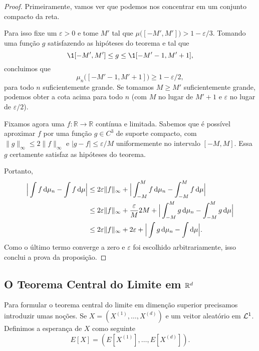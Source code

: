 \begin{proof}
  Primeiramente, vamos ver que podemos nos concentrar em um conjunto compacto da reta.

  Para isso fixe um $\varepsilon > 0$ e tome $M'$ tal que $\mu\big( [-M', M'] \big) > 1 - \varepsilon / 3$.
  Tomando uma função $g$ satisfazendo as hipóteses do teorema e tal que
  \begin{equation}
    \1{[-M',M']} \leq g \leq \1{[-M'-1,M'+1]},
  \end{equation}
  concluimos que
  \begin{equation}
    \mu_n \big( [-M'-1, M'+1] \big) \geq 1 - \varepsilon/2,
  \end{equation}
  para todo $n$ suficientemente grande.
  Se tomamos $M \geq M'$ suficientemente grande, podemos obter a cota acima para todo $n$ (com $M$ no lugar de $M'+1$ e $\varepsilon$ no lugar de $\varepsilon/2$).

  Fixamos agora uma $f: \mathbb{R} \to \mathbb{R}$ contínua e limitada.
  Sabemos que é possível aproximar $f$ por uma função $g \in C^3$ de suporte compacto, com $\lVert g \rVert_\infty \leq 2 \lVert f \rVert_\infty$ e $|g - f| \leq \varepsilon/M$ uniformemente no intervalo $[-M,M]$.
  Essa $g$ certamente satisfaz as hipóteses do teorema.

  Portanto,
  \begin{equation*}
    \begin{split}
      \Big| \int f \d \mu_n - \int f \d \mu\Big| & \leq 2 \varepsilon \lVert f \rVert_\infty + \Big| \int_{-M}^M f \d \mu_n - \int_{-M}^M f \d \mu\Big|\\
      & \leq 2 \varepsilon \lVert f \rVert_\infty + \frac \varepsilon{M} 2 M + \Big| \int_{-M}^M g \d \mu_n - \int_{-M}^M g \d \mu\Big|\\
      & \leq 2 \varepsilon \lVert f \rVert_\infty + 2 \varepsilon + \Big| \int g \d \mu_n - \int \d \mu\Big|.
    \end{split}
  \end{equation*}
  Como o último termo converge a zero e $\varepsilon$ foi escolhido arbitrariamente, isso conclui a prova da proposição.
\end{proof}


\subsection{O Teorema Central do Limite em ${\mathbb R}^d$}

Para formular o teorema central do limite em dimenção superior precisamos introduzir umas noções. 
Se $X=(X^{(1)},\dots,X^{(d)})$ e um veitor aleatório em ${\mathcal L}^1$. Definimos a esperança de $X$ como seguinte
$$E[X]= (E[X^{(1)}],\dots,E[X^{(d)}]).$$


